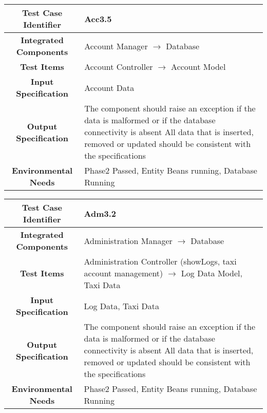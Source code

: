 \documentclass[11pt, a4paper,titlepage]{article}
\begin{document}
		\begin{tabularx}{\textwidth}{| c|X|}
			\hline \textbf{Test Case Identifier} & \label{Acc3.5}Acc3.5 \\
			\hline \textbf{Integrated Components} & Account Manager $\rightarrow $ Database \\
			\hline \textbf{Test Items} & Account Controller $\rightarrow $ Account Model \\
			\hline \textbf{Input Specification} & Account Data \\
			\hline \textbf{Output Specification} & The component should raise an exception if the data is malformed or if the database connectivity is absent \newline
			All data that is inserted, removed or updated should be consistent with the specifications\\
			\hline \textbf{Environmental Needs} & Phase2 Passed, Entity Beans running, Database Running \\
			\hline
		\end{tabularx}
		\newline
		
		\begin{tabularx}{\textwidth}{| c|X|}
			\hline \textbf{Test Case Identifier} & \label{Adm3.2}Adm3.2 \\
			\hline \textbf{Integrated Components} & Administration Manager $\rightarrow $ Database \\
			\hline \textbf{Test Items} & Administration Controller (showLogs, taxi account management) $\rightarrow $ Log Data Model, Taxi Data \\
			\hline \textbf{Input Specification} & Log Data, Taxi Data \\
			\hline \textbf{Output Specification} & The component should raise an exception if the data is malformed or if the database connectivity is absent \newline
			All data that is inserted, removed or updated should be consistent with the specifications\\
			\hline \textbf{Environmental Needs} & Phase2 Passed, Entity Beans running, Database Running \\
			\hline
		\end{tabularx}
		\newline
		
\end{document}
